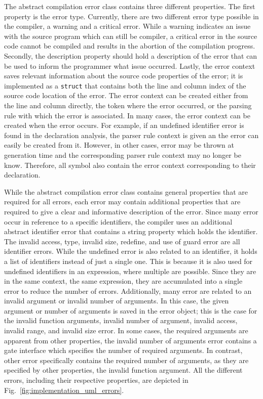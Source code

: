 The abstract compilation error class contains three different properties. The first property is the error type. Currently, there are two different error type possible in the compiler, a warning and a critical error. While a warning indicates an issue with the source program which can still be compiler, a critical error in the source code cannot be compiled and results in the abortion of the compilation progress. Secondly, the description property should hold a description of the error that can be used to inform the programmer what issue occurred. Lastly, the error context saves relevant information about the source code properties of the error; it is implemented as a \texttt{struct} that contains both the line and column index of the source code location of the error. The error context can be created either from the line and column directly, the token where the error occurred, or the parsing rule with which the error is associated. In many cases, the error context can be created when the error occurs. For example, if an undefined identifier error is found in the declaration analysis, the parser rule context is given an the error can easily be created from it. However, in other cases, error may be thrown at generation time and the corresponding parser rule context may no longer be know. Therefore, all symbol also contain the error context corresponding to their declaration. 

While the abstract compilation error class contains general properties that are required for all errors, each error may contain additional properties that are required to give a clear and informative description of the error. Since many error occur in reference to a specific identifiers, the compiler uses an additional abstract identifier error that contains a string property which holds the identifier. The invalid access, type, invalid size, redefine, and use of guard error are all identifier errors. While the undefined error is also related to an identifier, it holds a list of identifiers instead of just a single one. This is because it is also used for undefined identifiers in an expression, where multiple are possible. Since they are in the same context, \ie the same expression, they are accumulated into a single error to reduce the number of errors. Additionally, many error are related to an invalid argument or invalid number of arguments. In this case, the given argument or number of arguments is saved in the error object; this is the case for the invalid function arguments, invalid number of argument, invalid access, invalid range, and invalid size error. In some cases, the required arguments are apparent from other properties, \eg the invalid number of arguments error contains a gate interface which specifies the number of required arguments. In contrast, other error specifically contains the required number of arguments, as they are specified by other properties, \eg the invalid function argument. All the different errors, including their respective properties, are depicted in Fig.~\ref{fig:implementation_uml_errors}.

